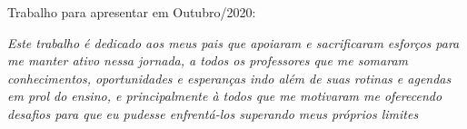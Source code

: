 \documentclass[	12pt, Times, openright, twoside, a4paper, english, brazil]{abntex2}
\begin{document}
    \begin{folhadeaprovacao}
      \begin{center}
        {\ABNTEXchapterfont\large\imprimirautor}

        \vspace*{\fill}\vspace*{\fill}
        {\ABNTEXchapterfont\bfseries\Large\imprimirtitulo}
        \vspace*{\fill}
        
        \hspace{.45\textwidth}
        \begin{minipage}{.5\textwidth}
            \imprimirpreambulo
        \end{minipage}%
        \vspace*{\fill}
       \end{center}
        
       Trabalho para apresentar em Outubro/2020:

          
       \begin{center}
        \vspace*{0.5cm}
        {\large\imprimirlocal}
        \par
        {\large\imprimirdata}
        \vspace*{1cm}
      \end{center}
      
    \end{folhadeaprovacao}

    \begin{dedicatoria}
       \vspace*{\fill}
       \centering
       \noindent
       \textit{ Este trabalho é dedicado aos meus pais que apoiaram e sacrificaram esforços para me manter ativo nessa jornada, a todos os professores que me somaram conhecimentos, oportunidades e esperanças indo além de suas rotinas e agendas em prol do ensino, e principalmente à todos que me motivaram me oferecendo desafios para que eu pudesse enfrentá-los superando meus próprios limites } \vspace*{\fill}
    \end{dedicatoria}
\end{document}
